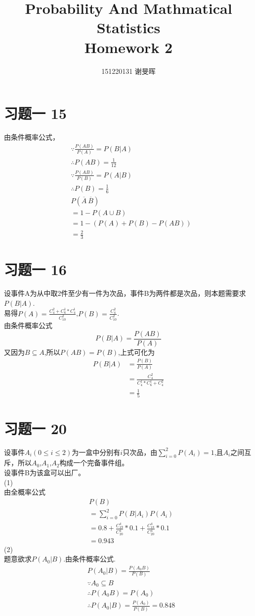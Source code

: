 \documentclass[a4paper]{ctexart}
\title{Probability And Mathmatical Statistics\\Homework 2}
\author{151220131 谢旻晖}
\date{}
\begin{document}
\maketitle
\section*{习题一 15}
\noindent
由条件概率公式，\\
\begin{align*}
&\because \frac{P(AB)}{P(A)}=P(B|A)\\
&\therefore P(AB)=\frac{1}{12}\\
&\because \frac{P(AB)}{P(B)}=P(A|B)\\
&\therefore P(B)=\frac{1}{6}\\
&P(\overline{A}\ \overline{B})\\
&=1-P(A\cup B)\\
&=1-(P(A)+P(B)-P(AB))\\
&=\frac{2}{3}
\end{align*}

\section*{习题一 16}
\noindent 设事件A为从中取2件至少有一件为次品，事件B为两件都是次品，则本题需要求$P(B|A)$.\\
\noindent 易得$P(A)=\frac{C_{4}^2+C_{6}^1*C_4^1}{C_{10}^{2}}$,$P(B)=\frac{C_{4}^2}{C_{10}^{2}}$.\\
\noindent 由条件概率公式
\[
P(B|A)=\frac{P(AB)}{P(A)}
\]
又因为$B\subseteq A$,所以$P(AB)=P(B)$,上式可化为
\begin{align*}
P(B|A)&=\frac{P(B)}{P(A)}\\
&=\frac{C_4^2}{C_4^1*C_6^1+C_4^2}\\
&=\frac{1}{5}
\end{align*}

\section*{习题一 20}
设事件$A_i (0\le i\le 2)$为一盒中分别有$i$只次品，由$\sum_{i=0}^{2}P(A_i)=1$,且$A_i$之间互斥，所以$A_0$,$A_1$,$A_2$构成一个完备事件组。\\
设事件B为该盒可以出厂。\\
(1)\\
由全概率公式
\begin{align*}
&P(B)\\
&=\sum_{i=0}^{2} P(B|A_i)P(A_i)\\
&=0.8+\frac{C_{19}^4}{C_{20}^4}*0.1+\frac{C_{18}^4}{C_{20}^4}*0.1\\
&=0.943
\end{align*}
(2)\\
题意欲求$P(A_0|B)$.由条件概率公式.\\
\begin{align*}
&P(A_0|B)=\frac{P(A_0B)}{P(B)}\\
&\because A_0 \subseteq B\\
&\therefore P(A_0B)=P(A_0)\\
&\therefore P(A_0|B)=\frac{P(A_0)}{P(B)}=0.848
\end{align*}
\end{document}
